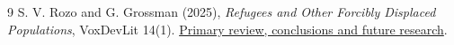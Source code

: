 \documentclass[11pt]{article}
\theoremstyle{definition}
\begin{document}
\begin{thebibliography}{9}
 S. V. Rozo and G. Grossman (2025), \emph{Refugees and Other Forcibly Displaced Populations}, VoxDevLit 14(1). \href{https://voxdev.org/voxdevlit/refugees-and-other-forcibly-displaced-populations/conclusions-future-research}{Primary review, conclusions and future research}.
\end{thebibliography}
\end{document}

